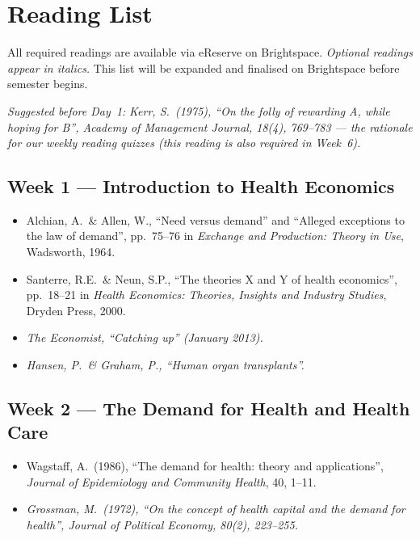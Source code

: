 \documentclass[11pt, a4paper]{article}
\begin{document}
\section{Reading List}

All required readings are available via eReserve on Brightspace. \emph{Optional readings appear in italics.} This list will be expanded and finalised on Brightspace before semester begins.

\noindent\emph{Suggested before Day~1:} \emph{Kerr, S.\ (1975), ``On the folly of rewarding A, while hoping for B'', \textit{Academy of Management Journal}, 18(4), 769--783 — the rationale for our weekly reading quizzes (this reading is also required in Week~6).}

\subsection{Week 1 — Introduction to Health Economics}
\begin{itemize}
  \item Alchian, A.\ \& Allen, W., ``Need versus demand'' and ``Alleged exceptions to the law of demand'', pp.~75--76 in \textit{Exchange and Production: Theory in Use}, Wadsworth, 1964.
  \item Santerre, R.E.\ \& Neun, S.P., ``The theories X and Y of health economics'', pp.~18--21 in \textit{Health Economics: Theories, Insights and Industry Studies}, Dryden Press, 2000.
  \item \emph{The Economist, ``Catching up'' (January 2013).}
  \item \emph{Hansen, P.\ \& Graham, P., ``Human organ transplants''.}
\end{itemize}

\subsection{Week 2 — The Demand for Health and Health Care}
\begin{itemize}
  \item Wagstaff, A.\ (1986), ``The demand for health: theory and applications'', \textit{Journal of Epidemiology and Community Health}, 40, 1--11.
  \item \emph{Grossman, M.\ (1972), ``On the concept of health capital and the demand for health'', \textit{Journal of Political Economy}, 80(2), 223--255.}
\end{itemize}
\end{document}

